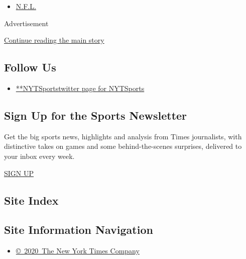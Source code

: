 \begin{itemize}
\tightlist
\item
  \protect\hyperlink{}{N.F.L.}
\end{itemize}

Advertisement

\protect\hyperlink{after-mktg}{Continue reading the main story}

\hypertarget{follow-us}{%
\subsection{Follow Us}\label{follow-us}}

\begin{itemize}
\tightlist
\item
  \href{https://twitter.com/NYTSports}{**NYTSportstwitter page for
  NYTSports}
\end{itemize}

\hypertarget{sign-up-for-the-sports-newsletter}{%
\subsection{Sign Up for the Sports
Newsletter}\label{sign-up-for-the-sports-newsletter}}

Get the big sports news, highlights and analysis from Times journalists,
with distinctive takes on games and some behind-the-scenes surprises,
delivered to your inbox every week.

\href{/newsletters/signup/SP}{SIGN UP}

\hypertarget{site-index}{%
\subsection{Site Index}\label{site-index}}

\hypertarget{site-information-navigation}{%
\subsection{Site Information
Navigation}\label{site-information-navigation}}

\begin{itemize}
\tightlist
\item
  \href{https://help.nytimes.com/hc/en-us/articles/115014792127-Copyright-notice}{©~2020~The
  New York Times Company}
\end{itemize}

